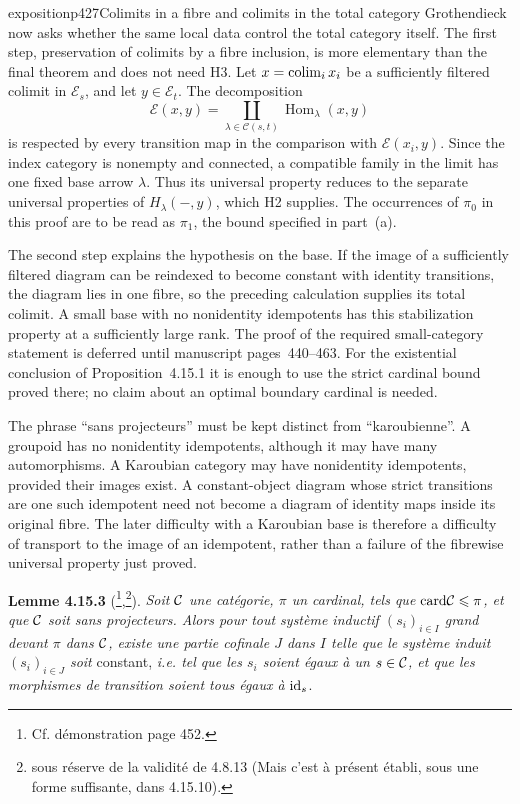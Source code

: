 \begin{dcomment}{exposition}{p427}{Colimits in a fibre and colimits in the total category}
Grothendieck now asks whether the same local data control the total category itself. The first step, preservation of colimits by a fibre inclusion, is more elementary than the final theorem and does not need H3. Let $x=\mathop{\rm colim}_i x_i$ be a sufficiently filtered colimit in $\mathcal E_s$, and let $y\in\mathcal E_t$. The decomposition
\[
 \mathcal E(x,y)=
 \coprod_{\lambda\in\mathcal C(s,t)}
       \operatorname{Hom}_\lambda(x,y)
\]
is respected by every transition map in the comparison with $\mathcal E(x_i,y)$. Since the index category is nonempty and connected, a compatible family in the limit has one fixed base arrow $\lambda$. Thus its universal property reduces to the separate universal properties of $H_\lambda(-,y)$, which H2 supplies. The occurrences of $\pi_0$ in this proof are to be read as $\pi_1$, the bound specified in part~(a).

The second step explains the hypothesis on the base. If the image of a sufficiently filtered diagram can be reindexed to become constant with identity transitions, the diagram lies in one fibre, so the preceding calculation supplies its total colimit. A small base with no nonidentity idempotents has this stabilization property at a sufficiently large rank. The proof of the required small-category statement is deferred until manuscript pages~440--463. For the existential conclusion of Proposition~4.15.1 it is enough to use the strict cardinal bound proved there; no claim about an optimal boundary cardinal is needed.

The phrase ``sans projecteurs'' must be kept distinct from ``karoubienne''. A groupoid has no nonidentity idempotents, although it may have many automorphisms. A Karoubian category may have nonidentity idempotents, provided their images exist. A constant-object diagram whose strict transitions are one such idempotent need not become a diagram of identity maps inside its original fibre. The later difficulty with a Karoubian base is therefore a difficulty of transport to the image of an idempotent, rather than a failure of the fibrewise universal property just proved.
\end{dcomment}


\textbf{Lemme 4.15.3} (\footnote{Cf. démonstration page 452.},\footnote{sous réserve de la validité de 4.8.13 (Mais c'est à présent établi, sous une forme suffisante, dans 4.15.10).}). \textit{Soit $\mathcal{C}$ une catégorie, $\pi$ un cardinal, tels que} $\mathrm{card}\mathcal{C} \leqslant \pi$\textit{, et que $\mathcal{C}$ soit sans projecteurs. Alors pour tout système inductif $(s_i)_{i\in I}$ grand devant $\pi$ dans $\mathcal{C}$, existe une partie cofinale $J$ dans $I$ telle que le système induit $(s_i)_{i\in J}$ soit} constant, \textit{i.e. tel que les $s_i$ soient égaux à un $s \in \mathcal{C}$, et que les morphismes de transition soient tous égaux à} $\mathrm{id}_s$.

